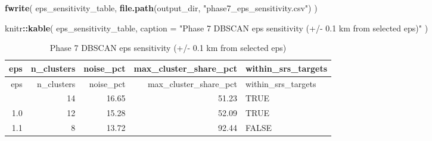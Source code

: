 \documentclass[
]{article}
\newenvironment{Shaded}{\begin{snugshade}}{\end{snugshade}}
\newcommand{\AttributeTok}[1]{\textcolor[rgb]{0.13,0.29,0.53}{#1}}
\newcommand{\FunctionTok}[1]{\textcolor[rgb]{0.13,0.29,0.53}{\textbf{#1}}}
\newcommand{\NormalTok}[1]{#1}
\newcommand{\SpecialCharTok}[1]{\textcolor[rgb]{0.81,0.36,0.00}{\textbf{#1}}}
\newcommand{\StringTok}[1]{\textcolor[rgb]{0.31,0.60,0.02}{#1}}
\begin{document}
\begin{Shaded}
\begin{Highlighting}[]
\FunctionTok{fwrite}\NormalTok{(}
\NormalTok{  eps\_sensitivity\_table,}
  \FunctionTok{file.path}\NormalTok{(output\_dir, }\StringTok{"phase7\_eps\_sensitivity.csv"}\NormalTok{)}
\NormalTok{)}

\NormalTok{knitr}\SpecialCharTok{::}\FunctionTok{kable}\NormalTok{(}
\NormalTok{  eps\_sensitivity\_table,}
  \AttributeTok{caption =} \StringTok{"Phase 7 DBSCAN eps sensitivity (+/{-} 0.1 km from selected eps)"}
\NormalTok{)}
\end{Highlighting}
\end{Shaded}

\begin{longtable}[]{@{}rrrrl@{}}
\caption{Phase 7 DBSCAN eps sensitivity (+/- 0.1 km from selected
eps)}\tabularnewline
\toprule\noalign{}
eps & n\_clusters & noise\_pct & max\_cluster\_share\_pct &
within\_srs\_targets \\
\midrule\noalign{}
\endfirsthead
\toprule\noalign{}
eps & n\_clusters & noise\_pct & max\_cluster\_share\_pct &
within\_srs\_targets \\
\midrule\noalign{}
\endhead
\bottomrule\noalign{}
\endlastfoot
0.9 & 14 & 16.65 & 51.23 & TRUE \\
1.0 & 12 & 15.28 & 52.09 & TRUE \\
1.1 & 8 & 13.72 & 92.44 & FALSE \\
\end{longtable}
\end{document}
